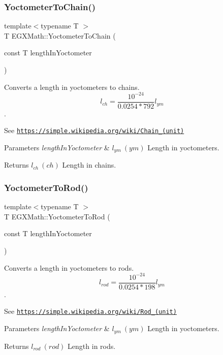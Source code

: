 \subsubsection{\texorpdfstring{Yoctometer\+To\+Chain()}{YoctometerToChain()}}
{\footnotesize\ttfamily template$<$typename T $>$ \\
T E\+G\+X\+Math\+::\+Yoctometer\+To\+Chain (\begin{DoxyParamCaption}\item[{const T}]{length\+In\+Yoctometer }\end{DoxyParamCaption})}



Converts a length in yoctometers to chains. \[ l_{ch}= \frac{10^{-24}}{0.0254 * 792} l_{ym} \]. 

See \href{https://simple.wikipedia.org/wiki/Chain_(unit)}{\tt https\+://simple.\+wikipedia.\+org/wiki/\+Chain\+\_\+(unit)} 
\begin{DoxyParams}{Parameters}
{\em length\+In\+Yoctometer} & $ l_{ym}\ (ym)$ Length in yoctometers. \\
\hline
\end{DoxyParams}
\begin{DoxyReturn}{Returns}
$ l_{ch}\ (ch)$ Length in chains. 
\end{DoxyReturn}
\mbox{\label{group___e_g_x_math-_conversions-_length_conversions-_yoctometer-_surveyors_gaabe3a5aaa7081b0489d25f0b2117c11b}} 
\subsubsection{\texorpdfstring{Yoctometer\+To\+Rod()}{YoctometerToRod()}}
{\footnotesize\ttfamily template$<$typename T $>$ \\
T E\+G\+X\+Math\+::\+Yoctometer\+To\+Rod (\begin{DoxyParamCaption}\item[{const T}]{length\+In\+Yoctometer }\end{DoxyParamCaption})}



Converts a length in yoctometers to rods. \[ l_{rod}= \frac{10^{-24}}{0.0254 * 198} l_{ym} \]. 

See \href{https://simple.wikipedia.org/wiki/Rod_(unit)}{\tt https\+://simple.\+wikipedia.\+org/wiki/\+Rod\+\_\+(unit)} 
\begin{DoxyParams}{Parameters}
{\em length\+In\+Yoctometer} & $ l_{ym}\ (ym)$ Length in yoctometers. \\
\hline
\end{DoxyParams}
\begin{DoxyReturn}{Returns}
$ l_{rod}\ (rod)$ Length in rods. 
\end{DoxyReturn}
